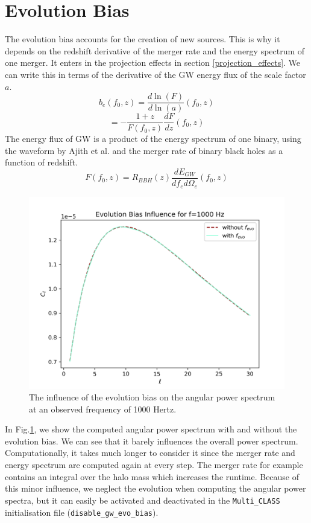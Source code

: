 \section{Evolution Bias}
\label{evo_bias_section}
The evolution bias accounts for the creation of new sources. This is why it depends on the redshift derivative of the merger rate and the energy spectrum of one merger. 
It enters in the projection effects in section \ref{projection_effects}.
We can write this in terms of the derivative of the GW energy flux of the scale factor $a$.
\begin{equation}
    b_e(f_0, z) = \frac{d\ln(F)}{d\ln(a)}(f_0, z)
\end{equation}
\begin{equation}
    = -\frac{1+z}{F(f_0, z)}\frac{dF}{dz}(f_0, z)
\end{equation}
The energy flux of GW is a product of the energy spectrum of one binary, using the waveform by Ajith et al. \cite{ajith_inspiral-merger-ringdown_2011} and the merger rate of binary black holes as a function of redshift.
\begin{equation}
    F(f_0, z) = R_{BBH}(z) \frac{d E_{GW}}{df_e d\Omega_e}(f_0, z)
\end{equation}

\begin{figure}
    \centering
    \includegraphics[width=0.9\linewidth]{Images/evo_bias_test.png}
    \caption{The influence of the evolution bias on the angular power spectrum at an observed frequency of 1000 Hertz.}
    \label{evo_bias_plot}
\end{figure} 

In Fig.\ref{evo_bias_plot}, we show the computed angular power spectrum with and without the evolution bias. We can see that it barely influences the overall power spectrum. Computationally, it takes much longer to consider it since the merger rate and energy spectrum are computed again at every step. The merger rate for example contains an integral over the halo mass which increases the runtime.
Because of this minor influence, we neglect the evolution when computing the angular power spectra, but it can easily be activated and deactivated in the {\tt Multi\_CLASS} initialisation file ({\tt disable\_gw\_evo\_bias}).


